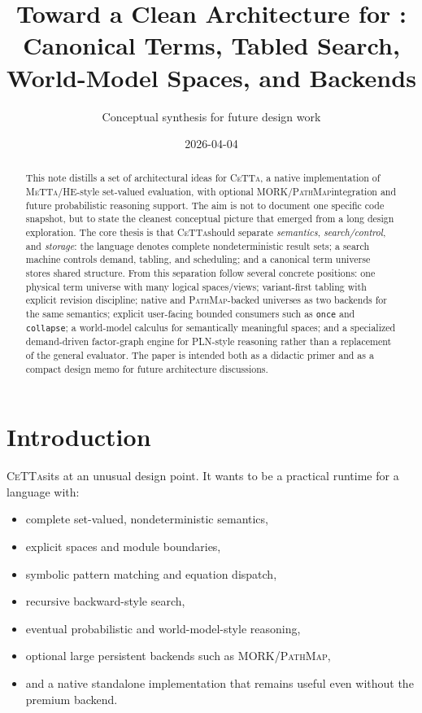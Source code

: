 \documentclass[11pt]{article}
\title{Toward a Clean Architecture for \CeTTa:\\Canonical Terms, Tabled Search, World-Model Spaces, and \PathMap Backends}
\author{Conceptual synthesis for future design work}
\date{2026-04-04}
\newcommand{\CeTTa}{\textsc{CeTTa}}
\newcommand{\MeTTa}{\textsc{MeTTa}}
\newcommand{\PathMap}{\textsc{PathMap}}
\newcommand{\MORK}{\textsc{MORK}}
\newcommand{\HE}{\textsc{HE}}
\begin{document}
\maketitle

\begin{abstract}
This note distills a set of architectural ideas for \CeTTa, a native implementation of \MeTTa/\HE-style set-valued evaluation, with optional \MORK/\PathMap integration and future probabilistic reasoning support. The aim is not to document one specific code snapshot, but to state the cleanest conceptual picture that emerged from a long design exploration. The core thesis is that \CeTTa should separate \emph{semantics}, \emph{search/control}, and \emph{storage}: the language denotes complete nondeterministic result sets; a search machine controls demand, tabling, and scheduling; and a canonical term universe stores shared structure. From this separation follow several concrete positions: one physical term universe with many logical spaces/views; variant-first tabling with explicit revision discipline; native and \PathMap-backed universes as two backends for the same semantics; explicit user-facing bounded consumers such as \texttt{once} and \texttt{collapse}; a world-model calculus for semantically meaningful spaces; and a specialized demand-driven factor-graph engine for PLN-style reasoning rather than a replacement of the general evaluator. The paper is intended both as a didactic primer and as a compact design memo for future architecture discussions.
\end{abstract}

\tableofcontents

\section{Introduction}
\CeTTa sits at an unusual design point. It wants to be a practical runtime for a language with:
\begin{itemize}
    \item complete set-valued, nondeterministic semantics,
    \item explicit spaces and module boundaries,
    \item symbolic pattern matching and equation dispatch,
    \item recursive backward-style search,
    \item eventual probabilistic and world-model-style reasoning,
    \item optional large persistent backends such as \MORK/\PathMap,
    \item and a native standalone implementation that remains useful even without the premium backend.
\end{itemize}
\end{document}
